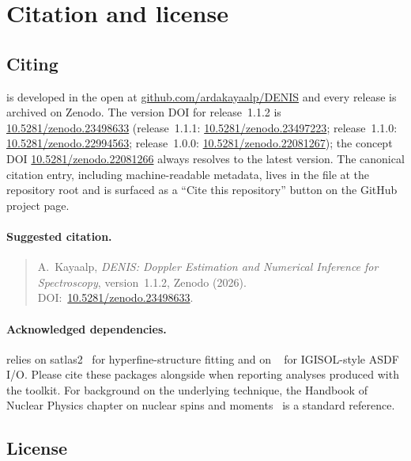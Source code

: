 \section{Citation and license}
\label{sec:citation}

\subsection{Citing \denis{}}

\denis{} is developed in the open at
\href{https://github.com/ardakayaalp/DENIS}{github.com/ardakayaalp/DENIS}
and every release is archived on Zenodo. The version DOI for
release~1.1.2 is
\href{https://doi.org/10.5281/zenodo.23498633}{10.5281/zenodo.23498633} (release~1.1.1:
\href{https://doi.org/10.5281/zenodo.23497223}{10.5281/zenodo.23497223};
release~1.1.0:
\href{https://doi.org/10.5281/zenodo.22994563}{10.5281/zenodo.22994563};
release~1.0.0:
\href{https://doi.org/10.5281/zenodo.22081267}{10.5281/zenodo.22081267});
the concept DOI
\href{https://doi.org/10.5281/zenodo.22081266}{10.5281/zenodo.22081266}
always resolves to the latest version. The canonical citation entry,
including machine-readable metadata, lives in the 
file at the repository root and is surfaced as a ``Cite this
repository'' button on the GitHub project page.

\paragraph{Suggested citation.}
\begin{quote}
    A.~Kayaalp, \emph{DENIS: Doppler Estimation and Numerical
    Inference for Spectroscopy}, version~1.1.2, Zenodo (2026).
    DOI:~\href{https://doi.org/10.5281/zenodo.23498633}%
    {10.5281/zenodo.23498633}.
\end{quote}

\paragraph{Acknowledged dependencies.}
\denis{} relies on satlas2~\cite{satlas2} for hyperfine-structure
fitting and on ~\cite{clstools} for IGISOL-style
ASDF I/O. Please cite these packages alongside \denis{} when
reporting analyses produced with the toolkit. For background on the
underlying technique, the Handbook of Nuclear Physics chapter on
nuclear spins and moments~\cite{cls_handbook} is a standard
reference.

\subsection{License}

